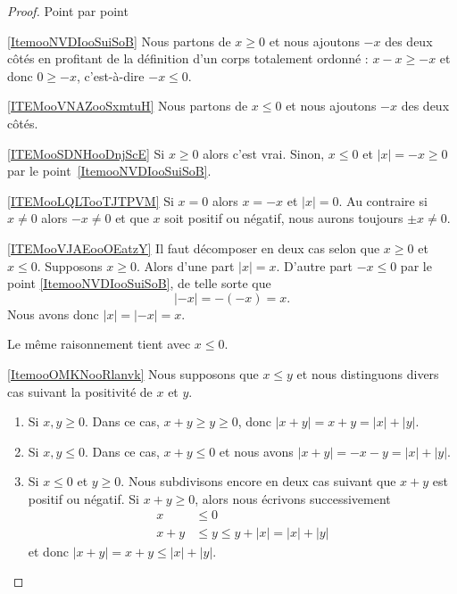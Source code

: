 \begin{proof}
    Point par point
    \begin{subproof}
    \item[\ref{ItemooNVDIooSuiSoB}]
            Nous partons de \( x\geq 0\) et nous ajoutons \( -x\) des deux côtés en profitant de la définition d'un corps totalement ordonné : \( x-x\geq -x\) et donc \( 0\geq-x\), c'est-à-dire \( -x\leq 0\).
        \item[\ref{ITEMooVNAZooSxmtuH}]
            Nous partons de \( x\leq 0\) et nous ajoutons \( -x\) des deux côtés.
        \item[\ref{ITEMooSDNHooDnjScE}]
            Si \( x\geq 0\) alors c'est vrai. Sinon, \( x\leq 0\) et \( | x |=-x\geq 0\) par le point~\ref{ItemooNVDIooSuiSoB}.
        \item[\ref{ITEMooLQLTooTJTPVM}]
            Si \( x=0\) alors \( x=-x\) et \( | x |=0\). Au contraire si \(x\neq 0\) alors \( -x\neq 0\) et que \( x\) soit positif ou négatif, nous aurons toujours \( \pm x\neq 0\).
        \item[\ref{ITEMooVJAEooOEatzY}]
            Il faut décomposer en deux cas selon que \( x\geq 0\) et \( x\leq 0\). Supposons \( x\geq 0\). Alors d'une part \( | x |=x\). D'autre part \( -x\leq 0\) par le point \ref{ItemooNVDIooSuiSoB}, de telle sorte que
            \begin{equation}
                | -x |=-(-x)=x.
            \end{equation}
            Nous avons donc \( | x |=| -x |=x\).

            Le même raisonnement tient avec \( x\leq 0\).
        \item[\ref{ItemooOMKNooRlanvk}]
            Nous supposons que \( x\leq y\) et nous distinguons divers cas suivant la positivité de \( x\) et \( y\).
            \begin{enumerate}
                \item
                    Si \( x,y\geq 0\). Dans ce cas, \( x+y\geq y\geq 0\), donc \( | x+y |=x+y=| x |+| y |\).
                \item
                    Si \( x,y\leq 0\). Dans ce cas, \( x+y\leq 0\) et nous avons \( | x+y |=-x-y=| x |+| y |\).
                \item
                    Si \( x\leq 0\) et \( y\geq 0\). Nous subdivisons encore en deux cas suivant que \( x+y\) est positif ou négatif. Si \( x+y\geq 0\), alors nous écrivons successivement
                    \begin{subequations}
                        \begin{align}
                            x&\leq 0\\
                            x+y&\leq y\leq y+| x |=| x |+| y |
                        \end{align}
                    \end{subequations}
                    et donc \( | x+y |=x+y\leq | x |+| y |\).


\end{enumerate}
\end{subproof}
\end{proof}
